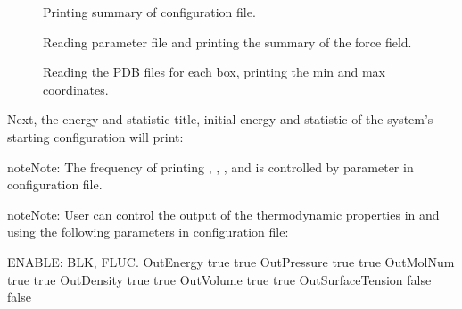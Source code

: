 \documentclass[letterpaper,10pt,english]{sphinxmanual}
\begin{document}
\begin{figure}[htbp]
\centering
\capstart

\noindent{}
\caption{Printing summary of configuration file.}\label{\detokenize{output_file:id1}}\end{figure}

\begin{figure}[htbp]
\centering
\capstart

\noindent{}
\caption{Reading parameter file and printing the summary of the force field.}\label{\detokenize{output_file:id2}}\end{figure}

\begin{figure}[htbp]
\centering
\capstart

\noindent{}
\caption{Reading the PDB files for each box, printing the min and max coordinates.}\label{\detokenize{output_file:id3}}\end{figure}

\sphinxAtStartPar
Next, the energy and statistic title, initial energy and statistic of the system’s starting configuration will print:

\begin{sphinxadmonition}{note}{Note:}
\sphinxAtStartPar
The frequency of printing , , , and  is controlled by 
parameter in configuration file.
\end{sphinxadmonition}

\begin{sphinxadmonition}{note}{Note:}
\sphinxAtStartPar
User can control the output of the thermodynamic properties in  and  using the following
parameters in configuration file:

\begin{sphinxVerbatim}[commandchars=\\\{\}]
\PYGZsh{}\PYGZsh{}\PYGZsh{}\PYGZsh{}\PYGZsh{}\PYGZsh{}\PYGZsh{}\PYGZsh{}\PYGZsh{}\PYGZsh{}\PYGZsh{}\PYGZsh{}\PYGZsh{}\PYGZsh{}\PYGZsh{}\PYGZsh{}\PYGZsh{}\PYGZsh{}\PYGZsh{}\PYGZsh{}\PYGZsh{}\PYGZsh{}\PYGZsh{}\PYGZsh{}\PYGZsh{}\PYGZsh{}\PYGZsh{}\PYGZsh{}\PYGZsh{}\PYGZsh{}\PYGZsh{}\PYGZsh{}\PYGZsh{}
\PYGZsh{} ENABLE:         BLK, FLUC.
\PYGZsh{}\PYGZsh{}\PYGZsh{}\PYGZsh{}\PYGZsh{}\PYGZsh{}\PYGZsh{}\PYGZsh{}\PYGZsh{}\PYGZsh{}\PYGZsh{}\PYGZsh{}\PYGZsh{}\PYGZsh{}\PYGZsh{}\PYGZsh{}\PYGZsh{}\PYGZsh{}\PYGZsh{}\PYGZsh{}\PYGZsh{}\PYGZsh{}\PYGZsh{}\PYGZsh{}\PYGZsh{}\PYGZsh{}\PYGZsh{}\PYGZsh{}\PYGZsh{}\PYGZsh{}\PYGZsh{}\PYGZsh{}\PYGZsh{}
OutEnergy         true  true
OutPressure       true  true
OutMolNum         true  true
OutDensity        true  true
OutVolume         true  true
OutSurfaceTension false false
\end{sphinxVerbatim}
\end{sphinxadmonition}
\end{document}
